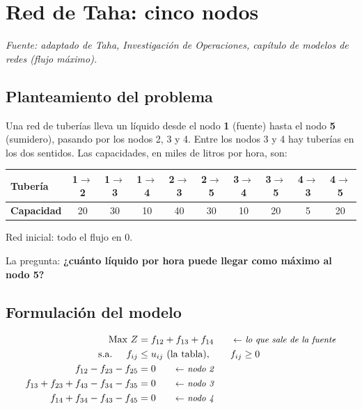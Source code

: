 \documentclass[11pt,a4paper]{article}
\newcommand{\ar}[4][arco]{\draw[#1] (#2) to node[etq, lbl] {#4} (#3);}
\newcommand{\nodosTaha}{%
  \node[fuente]   (t1) at (0,-2)     {1};
  \node[nodo]     (t2) at (1.8,-0.4) {2};
  \node[nodo]     (t3) at (1.8,-2)   {3};
  \node[nodo]     (t4) at (1.8,-3.6) {4};
  \node[sumidero] (t5) at (3.6,-2)   {5};}
\begin{document}
\section{Red de Taha: cinco nodos}
\textit{Fuente: adaptado de Taha, Investigación de Operaciones, capítulo de modelos de redes (flujo máximo).}

\subsection*{Planteamiento del problema}
Una red de tuberías lleva un líquido desde el nodo \textbf{1} (fuente) hasta el nodo \textbf{5} (sumidero),
pasando por los nodos 2, 3 y 4. Entre los nodos 3 y 4 hay tuberías en los dos sentidos. Las capacidades, en miles
de litros por hora, son:

\begin{center}\small
\begin{tabular}{lccccccccc}
\toprule
\textbf{Tubería} & 1$\to$2 & 1$\to$3 & 1$\to$4 & 2$\to$3 & 2$\to$5 & 3$\to$4 & 3$\to$5 & 4$\to$3 & 4$\to$5 \\
\midrule
\textbf{Capacidad} & 20 & 30 & 10 & 40 & 30 & 10 & 20 & 5 & 20 \\
\bottomrule
\end{tabular}

\medskip
\begin{minipage}{\linewidth}\centering
{}

Red inicial: todo el flujo en 0.
\end{minipage}
\end{center}

La pregunta: \textbf{¿cuánto líquido por hora puede llegar como máximo al nodo 5?}

\subsection*{Formulación del modelo}
\[
\begin{aligned}
\text{Max } Z &= f_{12} + f_{13} + f_{14} \nota{lo que sale de la fuente}\\
\text{s.a. } \quad f_{ij} &\le u_{ij} \ \text{(la tabla)}, \qquad f_{ij} \ge 0\\
f_{12} - f_{23} - f_{25} &= 0 \nota{nodo 2}\\
f_{13} + f_{23} + f_{43} - f_{34} - f_{35} &= 0 \nota{nodo 3}\\
f_{14} + f_{34} - f_{43} - f_{45} &= 0 \nota{nodo 4}
\end{aligned}
\]
\end{document}
